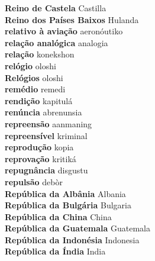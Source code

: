 \textbf{ Reino de Castela  } Castilla \\
\textbf{ Reino dos Países Baixos  } Hulanda \\
\textbf{ relativo à aviação  } aeronóutiko \\
\textbf{ relação analógica  } analogia \\
\textbf{ relação  } konekshon \\
\textbf{ relógio  } oloshi \\
\textbf{ Relógios  } oloshi \\
\textbf{ remédio  } remedi \\
\textbf{ rendição  } kapitulá \\
\textbf{ renúncia  } abrenunsia \\
\textbf{ repreensão  } aanmaning \\
\textbf{ repreensível  } kriminal \\
\textbf{ reprodução  } kopia \\
\textbf{ reprovação  } kritiká \\
\textbf{ repugnância  } disgustu \\
\textbf{ repulsão  } debòr \\
\textbf{ República da Albânia  } Albania \\
\textbf{ República da Bulgária  } Bulgaria \\
\textbf{ República da China  } China \\
\textbf{ República da Guatemala  } Guatemala \\
\textbf{ República da Indonésia  } Indonesia \\
\textbf{ República da Índia  } India \\
